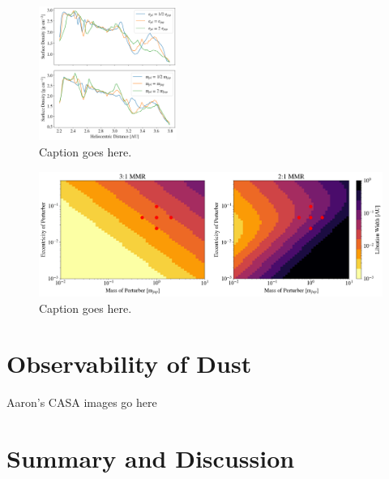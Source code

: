 \documentclass[onecolumn]{aastex63}
\begin{document}
\begin{figure}
    \begin{center}
    \includegraphics[width=0.4\textwidth]{figures/e_and_m_surf_den.png}
    \caption{Caption goes here.\label{fig:e_and_m_surf_den}}
    \end{center}
\end{figure}

\begin{figure}
    \includegraphics[width=\textwidth]{figures/lib_width.png}
    \caption{Caption goes here.\label{fig:lib_width}}
\end{figure}

\section{Observability of Dust} \label{sec:dust}

Aaron's CASA images go here

\section{Summary and Discussion} \label{sec:discuss}



\clearpage
\end{document}
